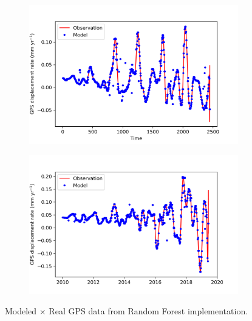 \documentclass{article}
\begin{document}
\begin{figure}[h!]
     \centering
     \begin{subfigure}[b]{0.48\textwidth}
         \centering
         \includegraphics[width=\textwidth, height = 0.88
         \textwidth]{NANO.png}
         \label{fig:dub}
     \end{subfigure}
     \hfill
     \begin{subfigure}[b]{0.48\textwidth}
         \centering
         \includegraphics[width=\textwidth, height = 0.88
         \textwidth ]{NEAH.png}
         \label{fig:1_1}
     \end{subfigure}
     \caption{Modeled $\times$ Real GPS data from Random Forest implementation.}
\end{figure}
\end{document}
